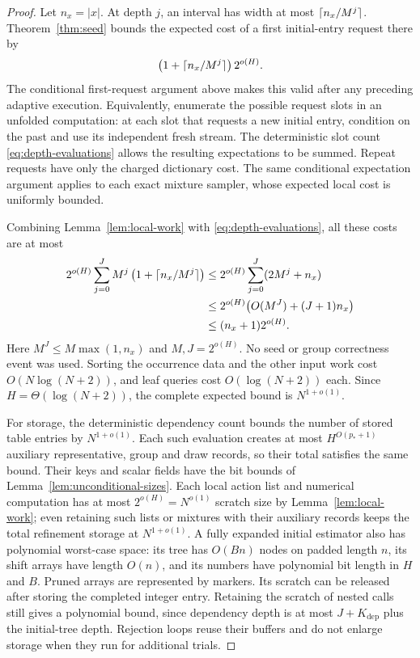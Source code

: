 \begin{proof}
Let $n_x=|x|$.  At depth $j$, an interval has width at most
$\lceil n_x/M^j\rceil$.  Theorem~\ref{thm:seed} bounds the expected cost
of a first initial-entry request there by
\[
 \left(1+\lceil n_x/M^j\rceil\right)2^{o(H)}.
\]
The conditional first-request argument above makes this valid after
any preceding adaptive execution.  Equivalently, enumerate the
possible request slots in an unfolded computation: at each slot
that requests a new initial entry, condition on the past and use
its independent fresh stream.  The deterministic slot count
\eqref{eq:depth-evaluations} allows the resulting expectations to
be summed.  Repeat requests have only the charged dictionary cost.
The same conditional expectation argument applies to each exact
mixture sampler, whose expected local cost is uniformly bounded.

Combining Lemma~\ref{lem:local-work} with
\eqref{eq:depth-evaluations}, all these costs are at most
\begin{align*}
 2^{o(H)}\sum_{j=0}^J
 M^j\left(1+\lceil n_x/M^j\rceil\right)
 &\le 2^{o(H)}\sum_{j=0}^J(2M^j+n_x)\\
 &\le 2^{o(H)}\bigl(O(M^J)+(J+1)n_x\bigr)\\
 &\le (n_x+1)2^{o(H)}.
\end{align*}
Here $M^J\le M\max(1,n_x)$ and $M,J=2^{o(H)}$.
No seed or group correctness event was used.  Sorting the occurrence
data and the other input work cost $O(N\log(N+2))$, and leaf queries
cost $O(\log(N+2))$ each.  Since $H=\Theta(\log(N+2))$, the complete
expected bound is $N^{1+o(1)}$.

For storage, the deterministic dependency count bounds the number
of stored table entries by $N^{1+o(1)}$.  Each such evaluation creates
at most $H^{O(p_*+1)}$ auxiliary representative, group and draw
records, so their total satisfies the same bound.  Their keys and
scalar fields have the bit bounds of Lemma~\ref{lem:unconditional-sizes}.
Each local action list and numerical computation has at most
$2^{o(H)}=N^{o(1)}$ scratch size by Lemma~\ref{lem:local-work}; even
retaining such lists or mixtures with their auxiliary records keeps
the total refinement storage at $N^{1+o(1)}$.  A fully expanded initial estimator
also has polynomial worst-case space: its tree has $O(Bn)$ nodes
on padded length $n$, its shift arrays have length $O(n)$, and its
numbers have polynomial bit length in $H$ and $B$.  Pruned arrays
are represented by markers.  Its scratch can be released after
storing the completed integer entry.  Retaining the scratch of
nested calls still gives a polynomial bound, since dependency
depth is at most $J+K_{\mathrm{dep}}$ plus the initial-tree depth.
Rejection loops reuse their buffers and do not enlarge storage
when they run for additional trials.


\end{proof}
